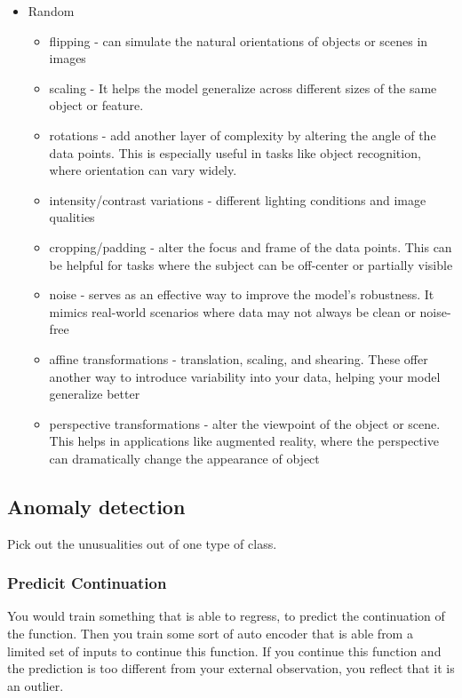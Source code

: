 \documentclass[11pt]{article}
\begin{document}
\begin{itemize}
    \item Random 
    \begin{itemize}
        \item flipping - can simulate the natural orientations of objects or scenes in images
        \item scaling - It helps the model generalize across different sizes of the same object or feature.
        \item rotations - add another layer of complexity by altering the angle of the data points. This is especially useful in tasks like object recognition, where orientation can vary widely.
        \item intensity/contrast variations - different lighting conditions and image qualities
        \item cropping/padding - alter the focus and frame of the data points. This can be helpful for tasks where the subject can be off-center or partially visible
        \item noise - serves as an effective way to improve the model's robustness. It mimics real-world scenarios where data may not always be clean or noise-free
        \item affine transformations - translation, scaling, and shearing. These offer another way to introduce variability into your data, helping your model generalize better
        \item perspective transformations -  alter the viewpoint of the object or scene. This helps in applications like augmented reality, where the perspective can dramatically change the appearance of object
    \end{itemize}
\end{itemize}

\subsection{Anomaly detection}

Pick out the unusualities out of one type of class. 

\subsubsection{Predicit Continuation}

You would train something that is able to regress, to predict the continuation of the function. Then you train some sort of auto encoder that is able from a limited set of inputs to continue this function. If you continue this function and the prediction is too different from your external observation, you reflect that it is an outlier.
\end{document}
